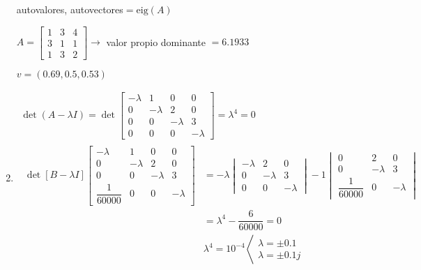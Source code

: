 \begin{enumerate}[label=\color{red}\textbf{\arabic*)}, leftmargin=*]
		autovalores, autovectores$=\mathrm{eig}(A)$
	
	$A=\begin{bmatrix}
		1 & 3 & 4\\
		3 & 1 & 1\\
		1 & 3 & 2
	\end{bmatrix}\longrightarrow$ valor propio dominante $=6.1933$
	
		$v=(0.69,0.5,0.53)$
	\item {}
	
	$\begin{array}{l}
		\det(A-\lambda I)=\det\begin{bmatrix}
		-\lambda & 1 & 0 & 0 \\
		0 & -\lambda & 2 & 0 \\
		0 & 0 & -\lambda & 3 \\
		0 & 0 & 0 & -\lambda
	\end{bmatrix}=\lambda^4=0\\
	\begin{aligned}
		\det[B-\lambda I]\begin{bmatrix}
	-\lambda & 1 & 0 & 0 \\
	0 & -\lambda & 2 & 0 \\
	0 & 0 & -\lambda & 3 \\
	\dfrac{1}{60000} & 0 & 0 & -\lambda
	\end{bmatrix}&=-\lambda\begin{vmatrix}
	-\lambda & 2 & 0 \\
	0 & -\lambda & 3 \\
	0 & 0 & -\lambda
	\end{vmatrix}-1\begin{vmatrix}
	0 & 2 & 0 \\
	0 & -\lambda & 3 \\
	\dfrac{1}{60000} & 0 & -\lambda
	\end{vmatrix}\\
	&=\lambda^4-\dfrac{6}{60000}=0\\
	&\lambda^4=10^{-4}\left\langle\begin{array}{l}
		\lambda=\pm0.1\\
		\lambda=\pm0.1j
	\end{array}\right.
	\end{aligned}
	\end{array}$
	

\end{enumerate}
